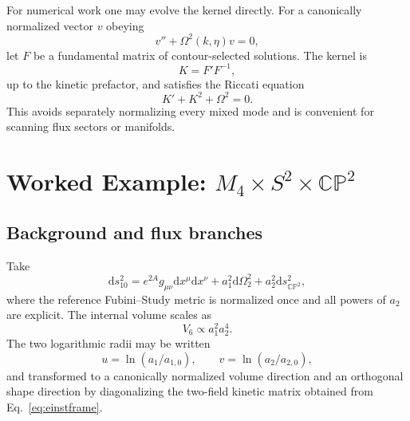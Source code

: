 \documentclass[aps,prd,twocolumn,superscriptaddress,nofootinbib,longbibliography]{revtex4-2}
\newcommand{\dd}{\mathrm d}
\newcommand{\CP}{\mathbb{CP}}
\begin{document}
For numerical work one may evolve the kernel directly. For a canonically normalized vector $v$ obeying
\begin{equation}
v''+\Omega^2(k,\eta)v=0,
\end{equation}
let $F$ be a fundamental matrix of contour-selected solutions. The kernel is
\begin{equation}
K=F'F^{-1},
\end{equation}
up to the kinetic prefactor, and satisfies the Riccati equation
\begin{equation}
K'+K^2+\Omega^2=0.
\label{eq:riccati}
\end{equation}
This avoids separately normalizing every mixed mode and is convenient for scanning flux sectors or manifolds.

\section{Worked Example: $M_4\times S^2\times\CP^2$}
\label{sec:s2cp2}

\subsection{Background and flux branches}
Take
\begin{equation}
\dd s_{10}^2=e^{2A}g_{\mu\nu}\dd x^\mu\dd x^\nu+a_1^2\dd\Omega_2^2+a_2^2\dd s_{\CP^2}^2,
\end{equation}
where the reference Fubini--Study metric is normalized once and all powers of $a_2$ are explicit. The internal volume scales as
\begin{equation}
V_6\propto a_1^2a_2^4.
\end{equation}
The two logarithmic radii may be written
\begin{equation}
u=\ln(a_1/a_{1,0}),\qquad v=\ln(a_2/a_{2,0}),
\end{equation}
and transformed to a canonically normalized volume direction and an orthogonal shape direction by diagonalizing the two-field kinetic matrix obtained from Eq.~\eqref{eq:einstframe}.
\end{document}
